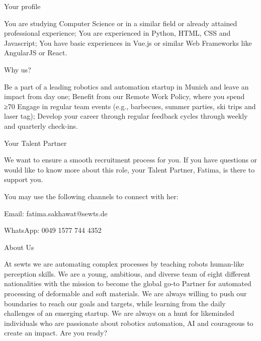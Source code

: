 Your profile

You are studying Computer Science or in a similar field or already attained professional experience;
You are experienced in Python, HTML, CSS and Javascript;
You have basic experiences in Vue.js or similar Web Frameworks like AngularJS or React.

Why us?

Be a part of a leading robotics and automation startup in Munich and leave an impact from day one;
Benefit from our Remote Work Policy, where you spend ≥70%
Engage in regular team events (e.g., barbecues, summer parties, ski trips and laser tag);
Develop your career through regular feedback cycles through weekly and quarterly check-ins.

Your Talent Partner

We want to ensure a smooth recruitment process for you. If you have questions or would like to know more about this role, your Talent Partner, Fatima, is there to support you.

You may use the following channels to connect with her:

Email: fatima.sakhawat@sewts.de

WhatsApp: 0049 1577 744 4352

About Us

At sewts we are automating complex processes by teaching robots human-like perception skills. We are a young, ambitious, and diverse team of eight different nationalities with the mission to become the global go-to Partner for automated processing of deformable and soft materials. We are always willing to push our boundaries to reach our goals and targets, while learning from the daily challenges of an emerging startup. We are always on a hunt for likeminded individuals who are passionate about robotics automation, AI and courageous to create an impact. Are you ready?

